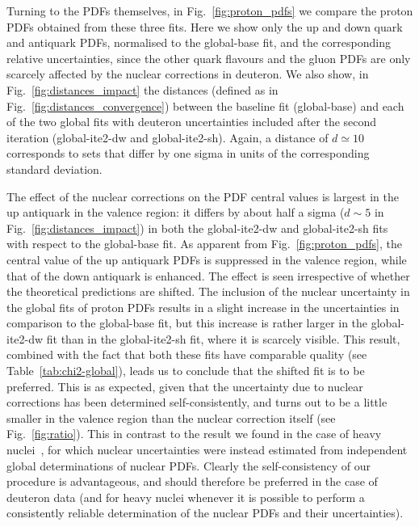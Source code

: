 \documentclass[11pt,a4paper]{article}
\begin{document}
Turning to the PDFs themselves, in Fig.~\ref{fig:proton_pdfs} we compare the
proton PDFs obtained from these three fits. Here we show only the up and down
quark and antiquark PDFs, normalised to the global-base fit, and the
corresponding relative uncertainties, since the other quark flavours and the
gluon PDFs are only scarcely affected by the nuclear corrections in deuteron.
We also show, in Fig.~\ref{fig:distances_impact} the distances (defined as in
Fig.~\ref{fig:distances_convergence}) between the baseline fit (global-base)
and each of the two global fits with deuteron uncertainties included after the
second iteration (global-ite2-dw and global-ite2-sh). Again, a distance of
$d\simeq 10$ corresponds to sets that differ by one sigma in units of the
corresponding standard deviation. 

The effect of the nuclear corrections on the PDF central values is largest in
the up antiquark in the valence region: it differs by about half a sigma
($d\sim 5$ in Fig.~\ref{fig:distances_impact}) in both the global-ite2-dw and
global-ite2-sh fits with respect to the global-base fit. As apparent from
Fig.~\ref{fig:proton_pdfs}, the central value of the up antiquark PDFs is
suppressed in the valence region, while that of the down antiquark is
enhanced. The effect is seen irrespective of whether the theoretical
predictions are shifted. The inclusion of the nuclear uncertainty in the global
fits of proton PDFs results in a slight increase in the uncertainties in
comparison to the global-base fit, but this increase is rather larger in the
global-ite2-dw fit than in the global-ite2-sh fit, where it is scarcely visible.
This result, combined with the fact that both these fits have comparable
quality (see Table~\ref{tab:chi2-global}), leads us to conclude that the
shifted fit is to be preferred. This is as expected, given that the uncertainty
due to nuclear corrections has been determined self-consistently, and
turns out to be a little smaller in the valence region than the nuclear
correction itself (see Fig.~\ref{fig:ratio}). This in contrast to the result we
found in the case of heavy nuclei~\cite{Ball:2018twp}, for which nuclear
uncertainties were instead estimated from independent global determinations of
nuclear PDFs. Clearly the self-consistency of our procedure is advantageous,
and should therefore be preferred in the case of deuteron data (and for heavy
nuclei whenever it is possible to perform a consistently reliable
determination of the nuclear PDFs and their uncertainties).
\end{document}
